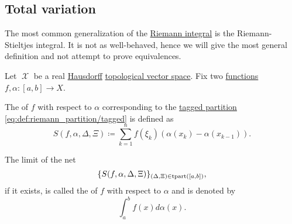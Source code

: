 \subsection{Total variation}\label{subsec:total_variation}

\begin{definition}\label{def:riemann_stieltjes_integral}
  The most common generalization of the \hyperref[def:riemann_integral]{Riemann integral} is the Riemann-Stieltjes integral. It is not as well-behaved, hence we will give the most general definition and not attempt to prove equivalences.

  Let \( \mscrX \) be a real \hyperref[def:separation_axioms/T2]{Hausdorff} \hyperref[def:topological_vector_space]{topological vector space}. Fix two \hyperref[def:function/single_valued]{functions} \( f, \alpha: [a, b] \to X \).

  The  of \( f \) with respect to \( \alpha \) corresponding to the \hyperref[def:riemann_partition/tagged]{tagged partition} \eqref{eq:def:riemann_partition/tagged} is defined as
  \begin{equation*}
    S(f, \alpha, \Delta, \Xi) \coloneqq \sum_{k=1}^n f(\xi_k) (\alpha(x_k) - \alpha(x_{k-1})).
  \end{equation*}

  The limit of the net
  \begin{equation}\label{eq:def:riemann_stieltjes_integral/net}
    \{ S(f, \alpha, \Delta, \Xi) \}_{(\Delta, \Xi) \in \operatorname{tpart}([a, b])},
  \end{equation}
  if it exists, is called the  of \( f \) with respect to \( \alpha \) and is denoted by
  \begin{equation*}
    \int_a^b f(x) d \alpha(x).
  \end{equation*}
\end{definition}
